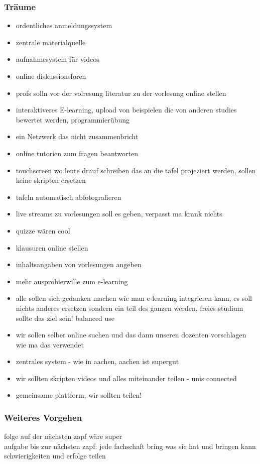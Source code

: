 \begin{itemize}
{\begin{itemize}
\subsubsection{Träume}
	\begin{itemize}
		\item ordentliches anmeldungssystem
		\item zentrale materialquelle
		\item aufnahmesystem für videos
		\item online diskussionsforen
		\item profs solln vor der volresung literatur zu der vorlesung online stellen
		\item interaktiveres E-learning, upload von beispielen die von anderen studies bewertet werden, programmierübung
		\item ein Netzwerk das nicht zusammenbricht
		\item online tutorien zum fragen beantworten
		\item touchscreen wo leute drauf schreiben das an die tafel projeziert werden, sollen keine skripten ersetzen
		\item tafeln automatisch abfotografieren
		\item live streams zu vorlesungen soll es geben, verpasst ma krank nichts
		\item quizze wären cool
		\item klausuren online stellen
		\item inhaltsangaben von vorlesungen angeben
		\item mehr ausprobierwille zum e-learning
		\item alle sollen sich gedanken machen wie man e-learning integrieren kann, es soll nichts anderes ersetzen sondern ein teil des ganzen werden, freies studium sollte das ziel sein! balanced use
		\item wir sollen selber online suchen und das dann unseren dozenten vorschlagen wie ma das verwendet
		\item zentrales system - wie in aachen, aachen ist supergut
		\item wir sollten skripten videos und alles miteinander teilen - unis connected
		\item gemeinsame plattform, wir sollten teilen!
	\end{itemize}

\subsubsection*{Weiteres Vorgehen}
folge auf der nächsten zapf wäre super \\
aufgabe bis zur nächsten zapf: jede fachschaft bring was sie hat und bringen kann \\
schwierigkeiten und erfolge teilen \\


\end{itemize}}
\end{itemize}
